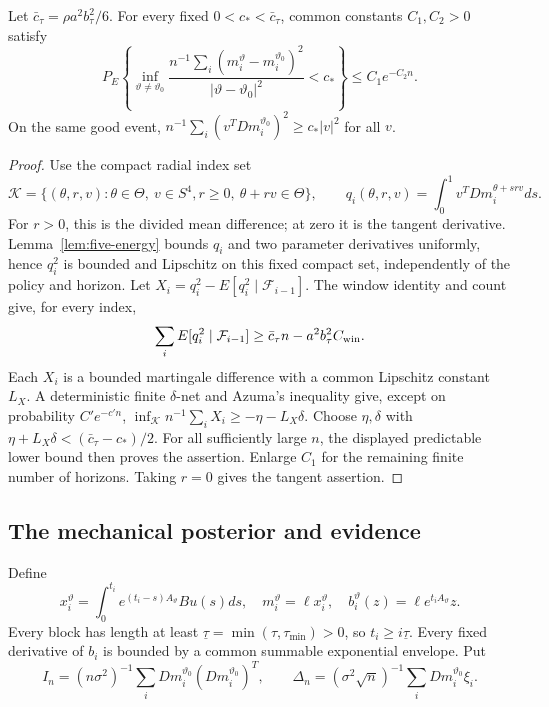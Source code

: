 \begin{proposition}
\label{prop:balanced-contrast}
Let \(\bar c_\tau=\rho a^2b_\tau^2/6\). For every fixed
\(0<c_*<\bar c_\tau\), common constants \(C_1,C_2>0\) satisfy
\begin{equation}
 P_E\left\{\inf_{\vartheta\ne\vartheta_0}
 \frac{n^{-1}\sum_i(m_i^\vartheta-m_i^{\vartheta_0})^2}
 {|\vartheta-\vartheta_0|^2}<c_*\right\}\le C_1e^{-C_2n}.
 \label{eq:full-empirical-contrast}
\end{equation}
On the same good event,
\(n^{-1}\sum_i(v^TDm_i^{\vartheta_0})^2\ge c_*|v|^2\) for all \(v\).
\end{proposition}
\begin{proof}
Use the compact radial index set
\[
 \mathscr K=\{(\theta,r,v):\theta\in\Theta,\ v\in S^4,
 r\ge0,\ \theta+rv\in\Theta\},\qquad
 q_i(\theta,r,v)=\int_0^1v^TDm_i^{\theta+srv}ds.
\]
For \(r>0\), this is the divided mean difference; at zero it is the
tangent derivative. Lemma~\ref{lem:five-energy} bounds \(q_i\) and two
parameter derivatives uniformly, hence \(q_i^2\) is bounded and
Lipschitz on this fixed compact set, independently of the policy and
horizon. Let \(X_i=q_i^2-E[q_i^2\mid\mathcal F_{i-1}]\).
The window identity and count give, for every index,
\[
 \sum_iE[q_i^2\mid\mathcal F_{i-1}]
 \ge\bar c_\tau n-a^2b_\tau^2 C_{\rm win}.
\]
Each \(X_i\) is a bounded martingale difference with a common Lipschitz
constant \(L_X\). A deterministic finite \(\delta\)-net and Azuma's
inequality give, except on probability \(C'e^{-c'n}\),
\(\inf_{\mathscr K}n^{-1}\sum_iX_i\ge-\eta-L_X\delta\).
Choose \(\eta,\delta\) with
\(\eta+L_X\delta<(\bar c_\tau-c_*)/2\).
For all sufficiently large \(n\), the displayed predictable lower bound
then proves the assertion. Enlarge \(C_1\) for the remaining finite
number of horizons. Taking \(r=0\) gives the tangent assertion.
\end{proof}

\subsection{The mechanical posterior and evidence}
Define
\[
 x_i^\vartheta=\int_0^{t_i}e^{(t_i-s)A_\vartheta}Bu(s)ds,
 \quad m_i^\vartheta=\ell x_i^\vartheta,
 \quad b_i^\vartheta(z)=\ell e^{t_iA_\vartheta}z.
\]
Every block has length at least
\(\underline\tau=\min(\tau,\tau_{\min})>0\), so
\(t_i\ge i\underline\tau\). Every fixed derivative of \(b_i\) is
bounded by a common summable exponential envelope. Put
\[
 I_n=(n\sigma^2)^{-1}\sum_i Dm_i^{\vartheta_0}(Dm_i^{\vartheta_0})^T,
 \qquad \Delta_n=(\sigma^2\sqrt n)^{-1}\sum_i Dm_i^{\vartheta_0}\xi_i.
\]

